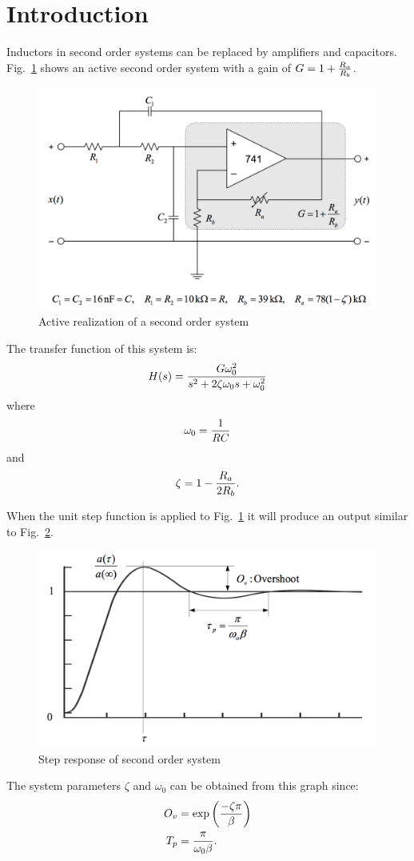\section{Introduction}\label{sec:intro}
Inductors in second order systems can be replaced by amplifiers and capacitors.
Fig.~\ref{fig:schematic} shows an active second order system with a gain of $G = 1 + {R_a \over R_b}$.

\begin{figure}[tbph]
	\centering
	\includegraphics[width=0.7\linewidth]{graphics/schematic}
	\caption{Active realization of a second order system}
	\label{fig:schematic}
\end{figure}

The transfer function of this system is:
\begin{equation}\label{eqn:tf}
	H(s) = { G \omega_0^2 \over s^2 + 2\zeta\omega_0 s + \omega_0^2 }
\end{equation}
where 
\begin{equation}\label{eqn:freq}
	\omega_0 = {1 \over RC}
\end{equation}and
\begin{equation}\label{eqn:damping}
	\zeta = 1 - {R_a \over 2R_b}.
\end{equation}

When the unit step function is applied to Fig.~\ref{fig:schematic} it will produce an output similar to Fig.~\ref{fig:overshoot_expected}.

\begin{figure}[tbph]
	\centering
	\includegraphics[width=0.7\linewidth]{graphics/overshoot_expected}
	\caption{Step response of second order system}
	\label{fig:overshoot_expected}
\end{figure}

The system parameters $\zeta$ and $\omega_0$ can be obtained from this graph since:
\begin{align}
	O_v &= \exp \left( { -\zeta\pi \over \beta } \right) \label{eqn:overshoot} \\
	T_p &= { \pi \over \omega_0\beta }. \label{eqn:period}
\end{align}
